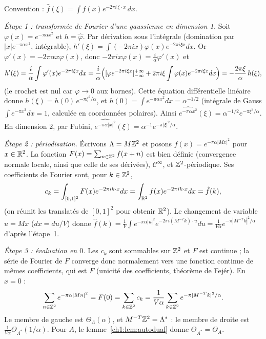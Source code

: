 \begin{humanproof}
Convention : $\hat f(\xi)=\int f(x)e^{-2\pi i\,\xi\cdot x}\,dx$.

\emph{Étape 1 : transformée de Fourier d'une gaussienne en dimension 1.} Soit $\varphi(x)=e^{-\pi\alpha x^2}$ et $h=\hat\varphi$.
Par dérivation sous l'intégrale (domination par $|x|e^{-\pi\alpha x^2}$, intégrable),
$h'(\xi)=\int(-2\pi i x)\varphi(x)e^{-2\pi i\xi x}dx$. Or $\varphi'(x)=-2\pi\alpha x\varphi(x)$, donc $-2\pi ix\varphi(x)=\frac{i}{\alpha}\varphi'(x)$ et
\[
  h'(\xi)=\frac i\alpha\int\varphi'(x)e^{-2\pi i\xi x}dx=\frac i\alpha\Bigl([\varphi e^{-2\pi i\xi x}]_{-\infty}^{+\infty}+2\pi i\xi\int\varphi(x)e^{-2\pi i\xi x}dx\Bigr)=-\frac{2\pi\xi}{\alpha}\,h(\xi),
\]
(le crochet est nul car $\varphi\to0$ aux bornes). Cette équation différentielle linéaire donne $h(\xi)=h(0)\,e^{-\pi\xi^2/\alpha}$, et
$h(0)=\int e^{-\pi\alpha x^2}dx=\alpha^{-1/2}$ (intégrale de Gauss $\int e^{-\pi x^2}dx=1$, calculée en coordonnées polaires). Ainsi
$\widehat{e^{-\pi\alpha x^2}}(\xi)=\alpha^{-1/2}e^{-\pi\xi^2/\alpha}$. En dimension $2$, par Fubini,
$\widehat{e^{-\pi\alpha|x|^2}}(\xi)=\alpha^{-1}e^{-\pi|\xi|^2/\alpha}$.

\emph{Étape 2 : périodisation.} Écrivons $\Lambda=M\mathbb{Z}^2$ et posons $f(x)=e^{-\pi\alpha|Mx|^2}$ pour $x\in\mathbb{R}^2$. La fonction
$F(x)=\sum_{n\in\mathbb{Z}^2}f(x+n)$ est bien définie (convergence normale locale, ainsi que celle de ses dérivées), $\mathcal C^\infty$, et $\mathbb{Z}^2$-périodique.
Ses coefficients de Fourier sont, pour $k\in\mathbb{Z}^2$,
\[
  c_k=\int_{[0,1]^2}F(x)e^{-2\pi ik\cdot x}dx=\int_{\mathbb{R}^2}f(x)e^{-2\pi ik\cdot x}dx=\hat f(k),
\]
(on réunit les translatés de $[0,1]^2$ pour obtenir $\mathbb{R}^2$). Le changement de variable $u=Mx$ ($dx=du/V$) donne
$\hat f(k)=\frac1V\int e^{-\pi\alpha|u|^2}e^{-2\pi i(M^{-T}k)\cdot u}du=\frac{1}{V\alpha}e^{-\pi|M^{-T}k|^2/\alpha}$ d'après l'étape~1.

\emph{Étape 3 : évaluation en $0$.} Les $c_k$ sont sommables sur $\mathbb{Z}^2$ et $F$ est continue ; la série de Fourier de $F$ converge donc normalement
vers une fonction continue de mêmes coefficients, qui est $F$ (unicité des coefficients, théorème de Fejér). En $x=0$ :
\[
  \sum_{n\in\mathbb{Z}^2}e^{-\pi\alpha|Mn|^2}=F(0)=\sum_{k\in\mathbb{Z}^2}c_k=\frac{1}{V\alpha}\sum_{k\in\mathbb{Z}^2}e^{-\pi|M^{-T}k|^2/\alpha}.
\]
Le membre de gauche est $\Theta_\Lambda(\alpha)$, et $M^{-T}\mathbb{Z}^2=\Lambda^*$ : le membre de droite est $\frac{1}{V\alpha}\Theta_{\Lambda^*}(1/\alpha)$.
Pour $A$, le lemme~\ref{ch1:lem:autodual} donne $\Theta_{A^*}=\Theta_A$.
\end{humanproof}

